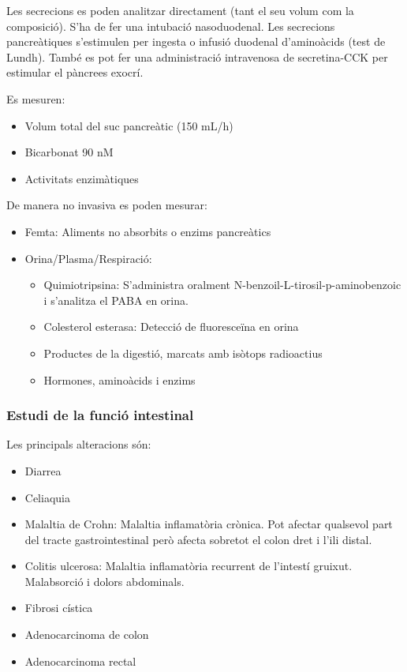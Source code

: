 Les secrecions es poden analitzar directament (tant el seu volum com la composició). S'ha de fer una intubació nasoduodenal. Les secrecions pancreàtiques s'estimulen per ingesta o infusió duodenal d'aminoàcids (test de Lundh). També es pot fer una administració intravenosa de secretina-CCK per estimular el pàncrees exocrí.

Es mesuren:
\begin{itemize}
\item Volum total del suc pancreàtic (150 mL/h)
\item Bicarbonat 90 nM
\item Activitats enzimàtiques
\end{itemize}

De manera no invasiva es poden mesurar:
\begin{itemize}
\item Femta: Aliments no absorbits o enzims pancreàtics
\item Orina/Plasma/Respiració:
  \begin{itemize}
  \item Quimiotripsina: S'administra oralment N-benzoil-L-tirosil-p-aminobenzoic i s'analitza el PABA en orina.
  \item Colesterol esterasa: Detecció de fluoresceïna en orina
  \item Productes de la digestió, marcats amb isòtops radioactius
  \item Hormones, aminoàcids i enzims
  \end{itemize}
\end{itemize}

\subsubsection{Estudi de la funció intestinal}
\label{sec:estudi-de-la-1}

Les principals alteracions són:
\begin{itemize}
\item Diarrea
\item Celiaquia
\item Malaltia de Crohn: Malaltia inflamatòria crònica. Pot afectar qualsevol part del tracte gastrointestinal però afecta sobretot el colon dret i l'ili distal.
\item Colitis ulcerosa: Malaltia inflamatòria recurrent de l'intestí gruixut. Malabsorció i dolors abdominals.
\item Fibrosi cística
\item Adenocarcinoma de colon
\item Adenocarcinoma rectal
\end{itemize}

